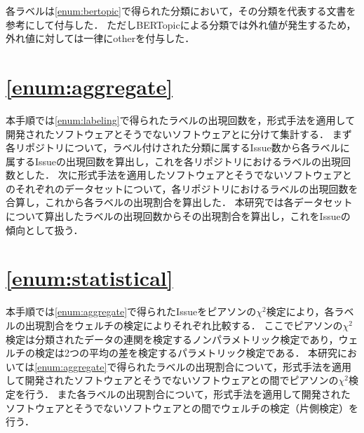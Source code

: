 \documentclass[main]{subfiles}
\begin{document}
各ラベルは\ref{enum:bertopic}で得られた分類において，その分類を代表する文書を参考にして付与した．
ただしBERTopicによる分類では外れ値が発生するため，外れ値に対しては一律にotherを付与した．


\section{\ref{enum:aggregate}}
\label{sec:aggregate}

本手順では\ref{enum:labeling}で得られたラベルの出現回数を，形式手法を適用して開発されたソフトウェアとそうでないソフトウェアとに分けて集計する．
まず各リポジトリについて，ラベル付けされた分類に属するIssue数から各ラベルに属するIssueの出現回数を算出し，これを各リポジトリにおけるラベルの出現回数とした．
次に形式手法を適用したソフトウェアとそうでないソフトウェアとのそれぞれのデータセットについて，各リポジトリにおけるラベルの出現回数を合算し，これから各ラベルの出現割合を算出した．
本研究では各データセットについて算出したラベルの出現回数からその出現割合を算出し，これをIssueの傾向として扱う．


\section{\ref{enum:statistical}}
\label{sec:statistical}

本手順では\ref{enum:aggregate}で得られたIssueをピアソンの\(\chi^2\)検定により，各ラベルの出現割合をウェルチの検定によりそれぞれ比較する．
ここでピアソンの\(\chi^2\)検定は分類されたデータの連関を検定するノンパラメトリック検定であり，ウェルチの検定は2つの平均の差を検定するパラメトリック検定である．
本研究においては\ref{enum:aggregate}で得られたラベルの出現割合について，形式手法を適用して開発されたソフトウェアとそうでないソフトウェアとの間でピアソンの\(\chi^2\)検定を行う．
また各ラベルの出現割合について，形式手法を適用して開発されたソフトウェアとそうでないソフトウェアとの間でウェルチの検定（片側検定）を行う．
\end{document}
